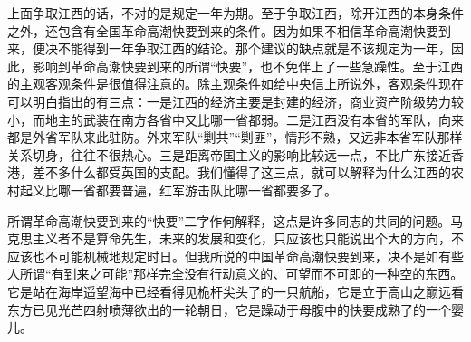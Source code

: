 上面争取江西的话，不对的是规定一年为期。至于争取江西，除开江西的本身条件之外，还包含有全国革命高潮快要到来的条件。因为如果不相信革命高潮快要到来，便决不能得到一年争取江西的结论。那个建议的缺点就是不该规定为一年，因此，影响到革命高潮快要到来的所谓“快要”，也不免伴上了一些急躁性。至于江西的主观客观条件是很值得注意的。除主观条件如给中央信上所说外，客观条件现在可以明白指出的有三点：一是江西的经济主要是封建的经济，商业资产阶级势力较小，而地主的武装在南方各省中又比哪一省都弱。二是江西没有本省的军队，向来都是外省军队来此驻防。外来军队“剿共”“剿匪”，情形不熟，又远非本省军队那样关系切身，往往不很热心。三是距离帝国主义的影响比较远一点，不比广东接近香港，差不多什么都受英国的支配。我们懂得了这三点，就可以解释为什么江西的农村起义比哪一省都要普遍，红军游击队比哪一省都要多了。

所谓革命高潮快要到来的“快要”二字作何解释，这点是许多同志的共同的问题。马克思主义者不是算命先生，未来的发展和变化，只应该也只能说出个大的方向，不应该也不可能机械地规定时日。但我所说的中国革命高潮快要到来，决不是如有些人所谓“有到来之可能”那样完全没有行动意义的、可望而不可即的一种空的东西。它是站在海岸遥望海中已经看得见桅杆尖头了的一只航船，它是立于高山之巅远看东方已见光芒四射喷薄欲出的一轮朝日，它是躁动于母腹中的快要成熟了的一个婴儿。


